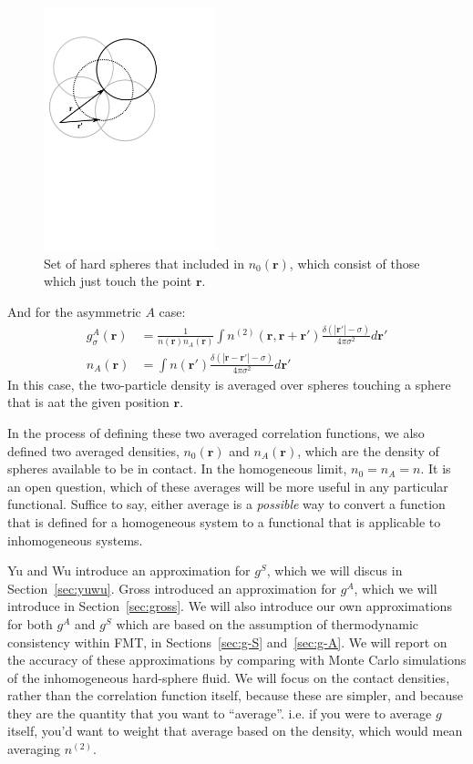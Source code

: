 \documentclass[letterpaper,twocolumn,amsmath,amssymb,jcp,10pt,aip]{revtex4-1}
\newcommand{\rr}{\textbf{r}}
\begin{document}
\begin{figure}
\includegraphics[width=5cm]{figs/n0}
\caption{Set of hard spheres that included in $n_0(\mathbf{r})$, which
  consist of those which just touch the point $\mathbf{r}$.}
\label{fig:n0}
\end{figure}

And for the asymmetric $A$ case:
\begin{align}
  g^A_\sigma(\rr) &= \frac{1}{n(\rr)n_A(\rr)}
  \int n^{(2)}(\rr, \rr + \rr')
  \frac{\delta(|\rr'| - \sigma)}{4\pi\sigma^2}d\rr' \label{eq:gA} \\
  n_A(\rr) &= \int n(\rr')
  \frac{\delta(|\rr-\rr'|-\sigma)}{4\pi\sigma^2} d\rr' \label{eq:nA}
\end{align}
In this case, the two-particle density is averaged over spheres
touching a sphere that is aat the given position $\rr$.

In the process of defining these two averaged correlation functions,
we also defined two averaged densities, $n_0(\rr)$ and $n_A(\rr)$,
which are the density of spheres available to be in
contact.  In the homogeneous limit, $n_0 = n_A = n$.  It is an
open question, which of these averages will be more useful in any
particular functional.  Suffice to say, either average is a
\emph{possible} way to convert a function that is defined for a
homogeneous system to a functional that is applicable to inhomogeneous
systems.

Yu and Wu introduce an approximation for
$g^S$\cite{yu2002fmt-dft-inhomogeneous-associating}, which we will
discus in Section~\ref{sec:yuwu}.  Gross introduced an
approximation for $g^A$\cite{gross2009density}, which we will
introduce in Section~\ref{sec:gross}.  We will also introduce our own
approximations for both $g^A$ and $g^S$ which are based on the
assumption of thermodynamic consistency within FMT, in
Sections~\ref{sec:g-S} and~\ref{sec:g-A}.  We will report on the accuracy of
these approximations by comparing with Monte Carlo simulations of the
inhomogeneous hard-sphere fluid.  We will focus on the contact
densities, rather than the correlation function itself, because these
are simpler, and because they are the quantity that you want to
``average''.  i.e. if you were to average $g$ itself, you'd want to
weight that average based on the density, which would mean averaging
$n^{(2)}$.
\end{document}
